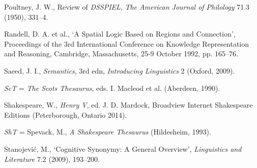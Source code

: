\begin{list}{}

\item %
Poultney, J. W., Review of \textit{DSSPIEL}, \textit{The American Journal of Philology} 71.3 (1950), 331–4.


\item %
Randell, D. A. et al., `A Spatial Logic Based on Regions and Connection', Proceedings of the 3rd International Conference on Knowledge Representation and Reasoning, Cambridge, Massachusetts, 25-9 October 1992, pp. 165–76.

\item %
Saeed, J. I., \textit{Semantics}, 3rd edn, \textit{Introducing Linguistics} 2 (Oxford, 2009).


\item %
\textit{ScT} = \textit{The Scots Thesaurus}, eds. I. Macleod et al. (Aberdeen, 1990).

\item %
Shakespeare, W., \textit{Henry V}, ed. J. D. Mardock, Broadview Internet Shakespeare Editions (Peterborough, Ontario 2014).

\item %
\textit{ShT} = Spevack, M., \textit{A Shakespeare Thesaurus} (Hildesheim, 1993).




\item %
Stanojević, M., `Cognitive Synonymy: A General Overview', \textit{Linguistics and Literature} 7.2 (2009), 193–200.


\end{list}
